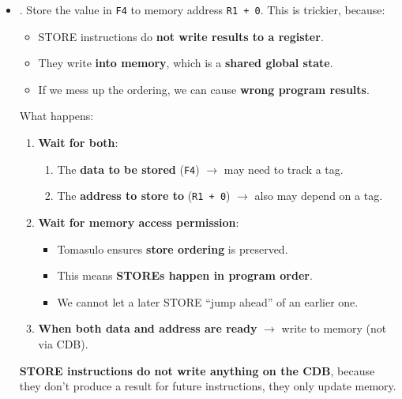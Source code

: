 \begin{enumerate}
\begin{itemize}
        \item {}. Store the value in \texttt{F4} to memory address \texttt{R1 + 0}. This is trickier, because:
        \begin{itemize}
            \item STORE instructions do \textbf{not write results to a register}.
            \item They write \textbf{into memory}, which is a \textbf{shared global state}.
            \item If we mess up the ordering, we can cause \textbf{wrong program results}.
        \end{itemize}
        What happens:
        \begin{enumerate}
            \item \textbf{Wait for both}:
            \begin{enumerate}
                \item The \textbf{data to be stored} (\texttt{F4}) $\rightarrow$ may need to track a tag.
                \item The \textbf{address to store to} (\texttt{R1 + 0}) $\rightarrow$ also may depend on a tag.
            \end{enumerate}

            \item \textbf{Wait for memory access permission}:
            \begin{itemize}
                \item Tomasulo ensures \textbf{store ordering} is preserved.
                \item This means \textbf{STOREs happen in program order}.
                \item We cannot let a later STORE ``jump ahead'' of an earlier one.
            \end{itemize}

            \item \textbf{When both data and address are ready} $\rightarrow$ write to memory (not via CDB).
        \end{enumerate}
        \textbf{STORE instructions do not write anything on the CDB}, because they don't produce a result for future instructions, they only update memory.
    \end{itemize}
\end{enumerate}

